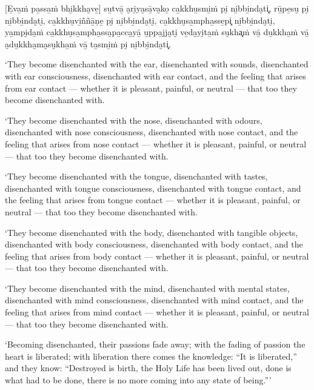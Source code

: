 \enlargethispage{2\baselineskip}

[E̱va̱ṁ pa̱ssa̱ṁ bhi̱kkha̮ve̱] su̱tvā̱ a̮ri̮ya̮sā̱va̮ko̱ ca̱kkhu̱smi̱ṁ pi̮ ni̱bbi̱nda̮ti͓,
rū̱pe̱su̮ pi̮ ni̱bbi̱nda̮ti̮, ca̱kkhu̮vi̱ññā̱ṇe̱ pi̮ ni̱bbi̱nda̮ti̮, ca̱kkhu̮sa̱mpha̱sse̱pi͓
ni̱bbi̱nda̮ti̮, ya̱mpi̮da̱ṁ ca̱kkhu̮sa̱mpha̱ssa̮pa̱cca̮yā̱ u̱ppa̱jja̮ti̮ ve̱da̮yi̮ta̱ṁ su̮kha͓ṁ
vā̱ du̱kkha̱ṁ vā̱ a̮du̱kkha̮ma̮su̮kha̱ṁ vā̱ ta̱smi̱ṁ pi̮ ni̱bbi̱nda̮ti͓.

\clearpage

\englishText
\markboth{\englishTitle}{\rightmark}

‘They become disenchanted with the ear, disenchanted with sounds,
disenchanted with ear consciousness, disenchanted with ear contact, and
the feeling that arises from ear contact --- whether it is pleasant,
painful, or neutral --- that too they become disenchanted with.

‘They become disenchanted with the nose, disenchanted with odours,
disenchanted with nose consciousness, disenchanted with nose contact,
and the feeling that arises from nose contact --- whether it is pleasant,
painful, or neutral --- that too they become disenchanted with.

‘They become disenchanted with the tongue, disenchanted with tastes,
disenchanted with tongue consciousness, disenchanted with tongue
contact, and the feeling that arises from tongue contact --- whether it is
pleasant, painful, or neutral --- that too they become disenchanted with.

‘They become disenchanted with the body, disenchanted with tangible
objects, disenchanted with body consciousness, disenchanted with body
contact, and the feeling that arises from body contact --- whether it is
pleasant, painful, or neutral --- that too they become disenchanted with.

‘They become disenchanted with the mind, disenchanted with mental
states, disenchanted with mind consciousness, disenchanted with mind
contact, and the feeling that arises from mind contact --- whether it is
pleasant, painful, or neutral --- that too they become disenchanted with.

‘Becoming disenchanted, their passions fade away; with the fading of
passion the heart is liberated; with liberation there comes the
knowledge: “It is liberated,” and they know: “Destroyed is birth, the
Holy Life has been lived out, done is what had to be done, there is no
more coming into any state of being.”\thinspace ’

\enlargethispage{\baselineskip}

